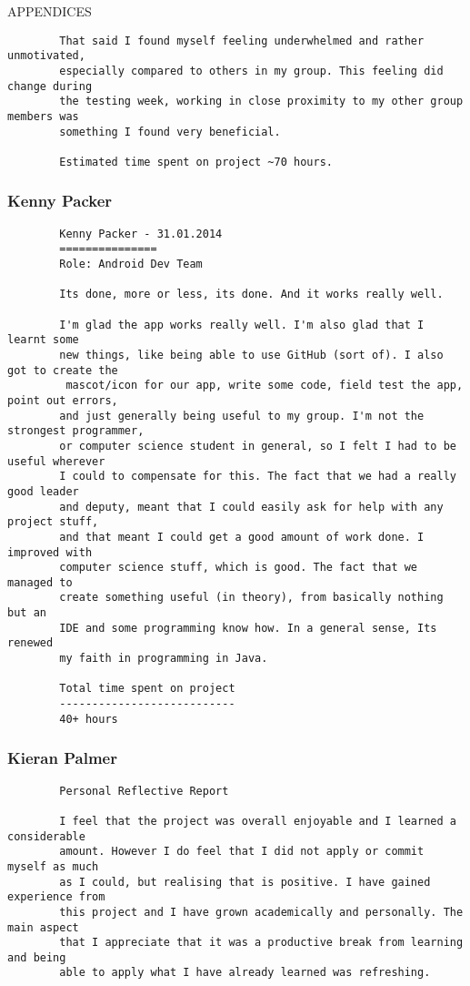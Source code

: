 \documentclass{article}
\begin{document}
\begin{section}{APPENDICES}
\begin{verbatim}
		That said I found myself feeling underwhelmed and rather unmotivated, 
		especially compared to others in my group. This feeling did change during 
		the testing week, working in close proximity to my other group members was 
		something I found very beneficial.

		Estimated time spent on project ~70 hours.

		\end{verbatim}
		
		\clearpage
		\subsubsection{Kenny Packer}
		\begin{verbatim}
		Kenny Packer - 31.01.2014
		===============
		Role: Android Dev Team

		Its done, more or less, its done. And it works really well.

		I'm glad the app works really well. I'm also glad that I learnt some 
		new things, like being able to use GitHub (sort of). I also got to create the
		 mascot/icon for our app, write some code, field test the app, point out errors,
		and just generally being useful to my group. I'm not the strongest programmer, 
		or computer science student in general, so I felt I had to be useful wherever 
		I could to compensate for this. The fact that we had a really good leader 
		and deputy, meant that I could easily ask for help with any project stuff, 
		and that meant I could get a good amount of work done. I improved with 
		computer science stuff, which is good. The fact that we managed to 
		create something useful (in theory), from basically nothing but an 
		IDE and some programming know how. In a general sense, Its renewed 
		my faith in programming in Java. 
		
		Total time spent on project
		---------------------------
		40+ hours
		\end{verbatim}
		
		\clearpage
		\subsubsection{Kieran Palmer}
		\begin{verbatim}
		Personal Reflective Report

		I feel that the project was overall enjoyable and I learned a considerable
		amount. However I do feel that I did not apply or commit myself as much 
		as I could, but realising that is positive. I have gained experience from
		this project and I have grown academically and personally. The main aspect 
		that I appreciate that it was a productive break from learning and being 
		able to apply what I have already learned was refreshing.


\end{verbatim}
\end{section}
\end{document}
